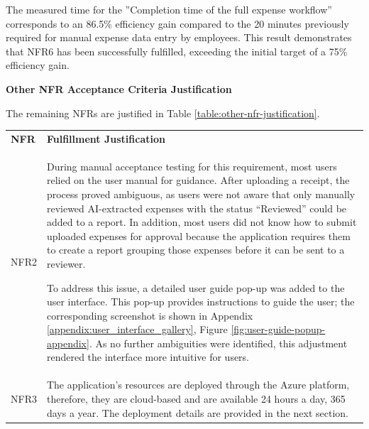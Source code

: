 \vspace{-10pt}

The measured time for the ''Completion time of the full expense workflow'' corresponds to an 86.5\% efficiency gain compared to the 20 minutes previously required for manual expense data entry by employees. This result demonstrates that NFR6 has been successfully fulfilled, exceeding the initial target of a 75\% efficiency gain. 

\textbf{Other NFR Acceptance Criteria Justification}

The remaining NFRs are justified in Table \ref{table:other-nfr-justification}.

\begin{table}[H]
    \centering
    \footnotesize
    \renewcommand{\arraystretch}{1.5}
    \setlength{\arrayrulewidth}{0.8pt}

    \begin{tabularx}{\textwidth}{
        >{\centering\arraybackslash}p{1.5cm}
        >{\arraybackslash}p{14.5cm}
    }
        \rowcolor{gray!20}
        \textbf{NFR} &
        \textbf{Fulfillment Justification} \\

       
        \rowcolor{gray!05}
        NFR2 &
        During manual acceptance testing for this requirement, most users relied on the user manual for guidance. After uploading a receipt, the process proved ambiguous, as users were not aware that only manually reviewed AI-extracted expenses with the status ``Reviewed'' could be added to a report. In addition, most users did not know how to submit uploaded expenses for approval because the application requires them to create a report grouping those expenses before it can be sent to a reviewer.

        To address this issue, a detailed user guide pop-up was added to the user interface. This pop-up provides instructions to guide the user; the corresponding screenshot is shown in Appendix \ref{appendix:user_interface_gallery}, Figure \ref{fig:user-guide-popup-appendix}. As no further ambiguities were identified, this adjustment rendered the interface more intuitive for users.\\

        \rowcolor{gray!05}
        NFR3 &
        The application's resources are deployed through the Azure platform, therefore, they are cloud-based and are available 24 hours a day, 365 days a year. The deployment details are provided in the next section. \\


\end{tabularx}
\end{table}
